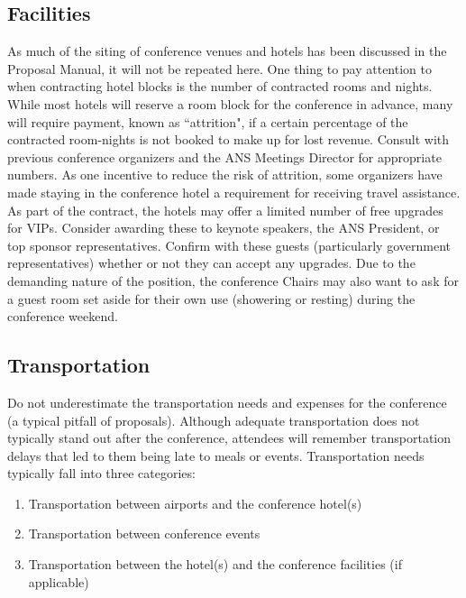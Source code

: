 \documentclass[12pt]{article}
\begin{document}
\subsection{Facilities}
As much of the siting of conference venues and hotels has been discussed in the Proposal Manual, it will not be repeated here.
One thing to pay attention to when contracting hotel blocks is the number of contracted rooms and nights.
While most hotels will reserve a room block for the conference in advance, many will require payment, known as ``attrition", if a certain percentage of the contracted room-nights is not booked to make up for lost revenue.
Consult with previous conference organizers and the ANS Meetings Director for appropriate numbers.
As one incentive to reduce the risk of attrition, some organizers have made staying in the conference hotel a requirement for receiving travel assistance.
As part of the contract, the hotels may offer a limited number of free upgrades for VIPs.
Consider awarding these to keynote speakers, the ANS President, or top sponsor representatives.
Confirm with these guests (particularly government representatives) whether or not they can accept any upgrades.
Due to the demanding nature of the position, the conference Chairs may also want to ask for a guest room set aside for their own use (showering or resting) during the conference weekend.

\subsection{Transportation}
Do not underestimate the transportation needs and expenses for the conference (a typical pitfall of proposals).
Although adequate transportation does not typically stand out after the conference, attendees will remember transportation delays that led to them being late to meals or events.
Transportation needs typically fall into three categories:
\begin{enumerate}
    \item Transportation between airports and the conference hotel(s)
    \item Transportation between conference events
    \item Transportation between the hotel(s) and the conference facilities (if applicable)
\end{enumerate}
\end{document}
